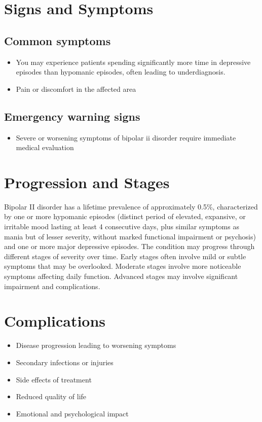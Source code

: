 \section{Signs and Symptoms}

\subsection{Common symptoms}
\begin{itemize}[noitemsep]
  \item You may experience patients spending significantly more time in depressive episodes than hypomanic episodes, often leading to underdiagnosis.
  \item Pain or discomfort in the affected area
  \end{itemize}

\subsection{Emergency warning signs}
\begin{itemize}[noitemsep]
  \item Severe or worsening symptoms of bipolar ii disorder require immediate medical evaluation
\end{itemize}
\section{Progression and Stages}
Bipolar II disorder has a lifetime prevalence of approximately 0.5\%, characterized by one or more hypomanic episodes (distinct period of elevated, expansive, or irritable mood lasting at least 4 consecutive days, plus similar symptoms as mania but of lesser severity, without marked functional impairment or psychosis) and one or more major depressive episodes. The condition may progress through different stages of severity over time. Early stages often involve mild or subtle symptoms that may be overlooked. Moderate stages involve more noticeable symptoms affecting daily function. Advanced stages may involve significant impairment and complications.
\section{Complications}
\begin{itemize}[noitemsep]
  \item Disease progression leading to worsening symptoms
  \item Secondary infections or injuries
  \item Side effects of treatment
  \item Reduced quality of life
  \item Emotional and psychological impact
\end{itemize}
